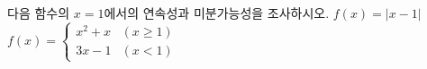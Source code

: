 다음 함수의 $x=1$에서의 연속성과 미분가능성을 조사하시오.
 $f(x)=|x-1|$
 $f(x)=\begin{cases} x^2+x & (x\ge 1) \\ 3x-1 & (x<1) \end{cases}$
